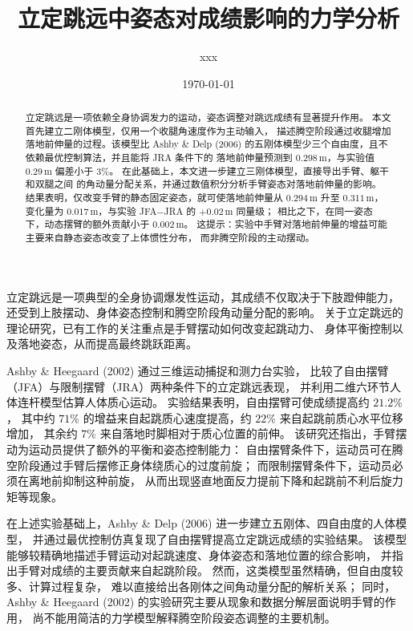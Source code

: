 \documentclass{article}
\begin{document}
\title{立定跳远中姿态对成绩影响的力学分析}
\author{xxx}
\date{\today}
\maketitle

\begin{abstract}
立定跳远是一项依赖全身协调发力的运动，姿态调整对跳远成绩有显著提升作用。
本文首先建立二刚体模型，仅用一个收腿角速度作为主动输入，
描述腾空阶段通过收腿增加落地前伸量的过程。该模型比 Ashby \& Delp (2006)
的五刚体模型少三个自由度，且不依赖最优控制算法，并且能将 JRA 条件下的
落地前伸量预测到 $0.298$\,m，与实验值 $0.29$\,m 偏差小于 $3\%$。
在此基础上，本文进一步建立三刚体模型，直接导出手臂、躯干和双腿之间
的角动量分配关系，并通过数值积分分析手臂姿态对落地前伸量的影响。
结果表明，仅改变手臂的静态固定姿态，就可使落地前伸量从 $0.294$\,m 升至
$0.311$\,m，变化量为 $0.017$\,m，与实验 JFA$-$JRA 的 $+0.02$\,m 同量级；
相比之下，在同一姿态下，动态摆臂的额外贡献小于 $0.002$\,m。
这提示：实验中手臂对落地前伸量的增益可能主要来自静态姿态改变了上体惯性分布，
而非腾空阶段的主动摆动。
\end{abstract}

立定跳远是一项典型的全身协调爆发性运动，其成绩不仅取决于下肢蹬伸能力，
还受到上肢摆动、身体姿态控制和腾空阶段角动量分配的影响。
关于立定跳远的理论研究，已有工作的关注重点是手臂摆动如何改变起跳动力、
身体平衡控制以及落地姿态，从而提高最终跳跃距离。

Ashby \& Heegaard (2002) 通过三维运动捕捉和测力台实验，
比较了自由摆臂（JFA）与限制摆臂（JRA）两种条件下的立定跳远表现，
并利用二维六环节人体连杆模型估算人体质心运动。
实验结果表明，自由摆臂可使成绩提高约 $21.2\%$，
其中约 $71\%$ 的增益来自起跳质心速度提高，约 $22\%$ 来自起跳前质心水平位移增加，
其余约 $7\%$ 来自落地时脚相对于质心位置的前伸。
该研究还指出，手臂摆动为运动员提供了额外的平衡和姿态控制能力：
自由摆臂条件下，运动员可在腾空阶段通过手臂后摆修正身体绕质心的过度前旋；
而限制摆臂条件下，运动员必须在离地前抑制这种前旋，
从而出现竖直地面反力提前下降和起跳前不利后旋力矩等现象。

在上述实验基础上，Ashby \& Delp (2006) 进一步建立五刚体、四自由度的人体模型，
并通过最优控制仿真复现了自由摆臂提高立定跳远成绩的实验结果。
该模型能够较精确地描述手臂运动对起跳速度、身体姿态和落地位置的综合影响，
并指出手臂对成绩的主要贡献来自起跳阶段。
然而，这类模型虽然精确，但自由度较多、计算过程复杂，
难以直接给出各刚体之间角动量分配的解析关系；
同时，Ashby \& Heegaard (2002) 的实验研究主要从现象和数据分解层面说明手臂的作用，
尚不能用简洁的力学模型解释腾空阶段姿态调整的主要机制。
\end{document}
